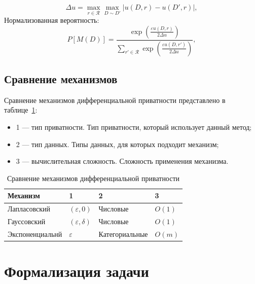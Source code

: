 \begin{equation}\label{eq:exp}
    \Delta u = \max_{r \in \mathcal{R}} \max_{D \sim D'} |u(D, r) - u(D', r)|,
\end{equation}
Нормализованная вероятность:
\begin{equation}
    P[M(D)] = \frac{\exp\left(\frac{\varepsilon u(D, r)}{2\Delta u}\right)}{\sum_{r' \in \mathcal{R}} \exp\left(\frac{\varepsilon u(D, r')}{2\Delta u}\right)},
\end{equation}



\newpage
\subsection{Сравнение механизмов}

Сравнение механизмов дифференциальной приватности представлено в таблице~\ref{tab:dp}:

\begin{itemize}[label*=---]
	\item 1 --- тип приватности. Тип приватности, который использует данный метод;
	\item 2 --- тип данных. Типы данных, для которых подходит механизм;
	\item 3 --- вычислительная сложность. Сложность применения механизма.
\end{itemize}

\begin{table}[ht]
	\centering
	\captionsetup{justification=raggedleft}
	\caption{Сравнение механизмов дифференциальной приватности}
	\label{tab:dp}
\begin{tabularx}{\textwidth}{|X|X|X|X|}
	\hline
	Механизм & 1 & 2 & 3 \\
	\hline
	Лапласовский &  $(\varepsilon, 0)$ & Числовые & $O(1)$ \\
	\hline
	Гауссовский & $(\varepsilon, \delta)$ & Числовые & $O(1)$ \\
	\hline
	Экспоненциальнй& $\varepsilon$ & Категориальные & $O(m)$ \\
	\hline
\end{tabularx}
\end{table}
\section{Формализация задачи}

